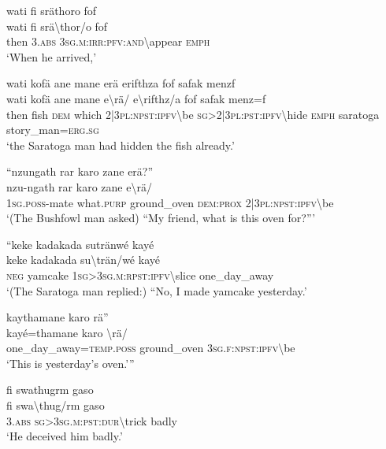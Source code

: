 \ea\label{ex:3:a7545}
wati fi sräthoro fof\\
\gll wati	fi	srä{\textbackslash}thor/o	fof\\
     then	3.\textsc{abs}	3\textsc{sg}.\textsc{m}:\textsc{irr}:\textsc{pfv}:\textsc{and}{\textbackslash}appear	\textsc{emph}\\
\glt `When he arrived,'
\z

\ea\label{ex:3:a7546}
wati kofä ane mane erä erifthza fof safak menzf\\
\gll wati	kofä	ane	mane	e{\textbackslash}rä/	e{\textbackslash}rifthz/a	fof	safak	menz=f\\
     then	fish	\textsc{dem}	which	2|3\textsc{pl}:\textsc{npst}:\textsc{ipfv}{\textbackslash}be	\textsc{sg}>2|3\textsc{pl}:\textsc{pst}:\textsc{ipfv}{\textbackslash}hide	\textsc{emph}	saratoga	story\_man=\textsc{erg}.\textsc{sg}\\
\glt `the Saratoga man had hidden the fish already.'
\z

\ea\label{ex:3:a7549}
``nzungath rar karo zane erä?''\\
\gll nzu-ngath	rar	karo	zane	e{\textbackslash}rä/\\
     1\textsc{sg}.\textsc{poss}-mate	what.\textsc{purp}	ground\_oven	\textsc{dem}:\textsc{prox}	2|3\textsc{pl}:\textsc{npst}:\textsc{ipfv}{\textbackslash}be\\
\glt `(The Bushfowl man asked) ``My friend, what is this oven for?'''
\z

\ea\label{ex:3:a7551}
``keke kadakada sutränwé kayé\\
\gll keke	kadakada	su{\textbackslash}trän/wé	kayé\\
     \textsc{neg}	yamcake	1\textsc{sg}>3\textsc{sg}.\textsc{m}:\textsc{rpst}:\textsc{ipfv}{\textbackslash}slice	one\_day\_away\\
\glt `(The Saratoga man replied:) ``No, I made yamcake yesterday.'
\z

\ea\label{ex:3:a7553}
kaythamane karo rä''\\
\gll kayé=thamane	karo	{\textbackslash}rä/\\
     one\_day\_away=\textsc{temp}.\textsc{poss}	ground\_oven	3\textsc{sg}.\textsc{f}:\textsc{npst}:\textsc{ipfv}{\textbackslash}be\\
\glt `This is yesterday's oven.'''
\z

\ea\label{ex:3:a7554}
fi swathugrm gaso\\
\gll fi	swa{\textbackslash}thug/rm	gaso\\
     3.\textsc{abs}	\textsc{sg}>3\textsc{sg}.\textsc{m}:\textsc{pst}:\textsc{dur}{\textbackslash}trick	badly\\
\glt `He deceived him badly.'
\z

